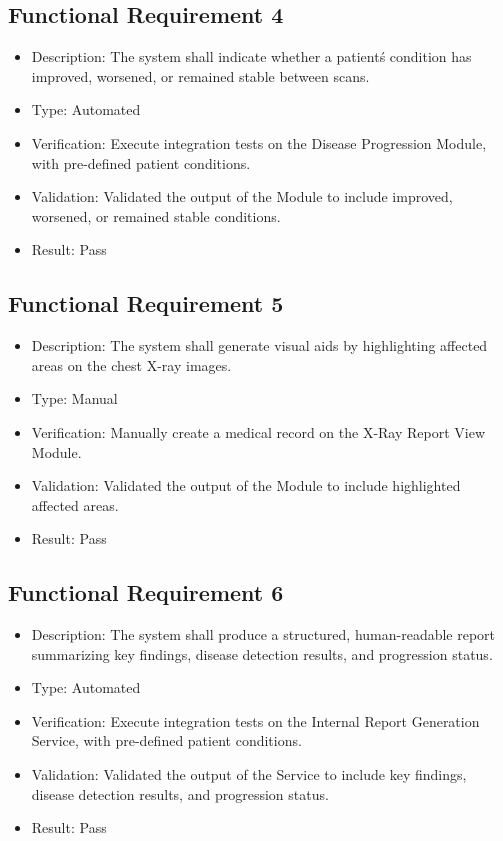 \documentclass[12pt, titlepage]{article}
\begin{document}
\subsection{Functional Requirement 4}
\begin{itemize}  
  \item Description: The system shall indicate whether a patient\'s condition has improved, worsened, or remained stable between scans.
  \item Type: Automated
  \item Verification: Execute integration tests on the Disease Progression Module, with pre-defined patient conditions.
  \item Validation: Validated the output of the Module to include improved, worsened, or remained stable conditions.
  \item Result: Pass
\end{itemize}

\subsection{Functional Requirement 5}
\begin{itemize}  
  \item Description: The system shall generate visual aids by highlighting affected areas on the chest X-ray images.
  \item Type: Manual
  \item Verification: Manually create a medical record on the X-Ray Report View Module.
  \item Validation: Validated the output of the Module to include highlighted affected areas.
  \item Result: Pass
\end{itemize}

\subsection{Functional Requirement 6}
\begin{itemize}  
  \item Description: The system shall produce a structured, human-readable report summarizing key findings, disease detection results, and progression status.
  \item Type: Automated
  \item Verification: Execute integration tests on the Internal Report Generation Service, with pre-defined patient conditions.
  \item Validation: Validated the output of the Service to include key findings, disease detection results, and progression status.
  \item Result: Pass
\end{itemize}
\end{document}
